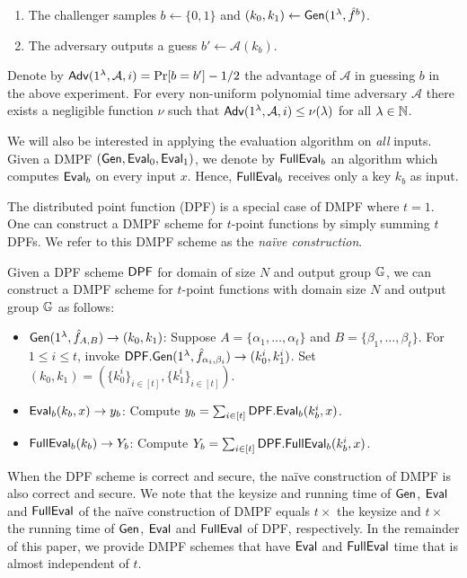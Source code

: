 \begin{definition}
\begin{itemize}
\begin{enumerate}
          \item The challenger samples $b\gets\{0,1\}$ and $(k_0,k_1)\leftarrow{\sf Gen}(1^\lambda,\hat{f}^b)$.
          \item The adversary outputs a guess $b'\leftarrow\mathcal{A}(k_b)$.
      \end{enumerate}
      Denote by ${\sf Adv}(1^\lambda,\mathcal{A},i)=\Pr[b=b']-1/2$ the advantage of $\mathcal{A}$ in guessing $b$ in the above experiment. For every non-uniform polynomial time adversary $\mathcal{A}$ there exists a negligible function $\nu$ such that ${\sf Adv}(1^\lambda,\mathcal{A},i) \le \nu(\lambda)$ for all $\lambda \in \mathbb{N}$.\fi
  \end{itemize}
  \end{definition}
 We will also be interested in applying the evaluation algorithm on \emph{all} inputs. Given a DMPF $({\sf Gen},{\sf Eval}_0,{\sf Eval}_1)$, we denote by ${\sf FullEval}_b$ an algorithm which computes ${\sf Eval}_b$ on every input $x$. Hence, ${\sf FullEval}_b$ receives only a key $k_b$ as input.

The distributed point function (DPF) is a special case of DMPF where $t=1$. 
One can construct a DMPF scheme for $t$-point functions by simply summing $t$ DPFs. We refer to this DMPF scheme as the {\em na\"ive construction}. 
\begin{construction}\label{con:naive_DMPF}
  Given a DPF scheme ${\sf DPF}$ for domain of size $N$ and output group $\mathbb{G}$, we can construct a DMPF scheme for $t$-point functions with domain size $N$ and output group $\mathbb{G}$ as follows: 
  \begin{itemize}
    \item ${\sf Gen}(1^\lambda, \hat{f}_{A, B})\rightarrow (k_0, k_1)$: Suppose $A = \{\alpha_1,\dots, \alpha_t\}$ and $B = \{\beta_1,\dots, \beta_t\}$. For $1\le i\le t$, invoke ${\sf DPF}.{\sf Gen}(1^\lambda, \hat{f}_{\alpha_i, \beta_i})\rightarrow (k_0^i, k_1^i)$. Set $(k_0, k_1) = (\{k_0^i\}_{i\in [t]}, \{k_1^i\}_{i\in [t]})$. 
    \item ${\sf Eval}_b(k_b, x)\rightarrow y_b$: Compute $y_b = \sum_{i\in [t]}{\sf DPF}.{\sf Eval}_b(k_b^i, x)$. 
    \item ${\sf FullEval}_b(k_b)\rightarrow Y_b$: Compute $Y_b = \sum_{i\in [t]}{\sf DPF}.{\sf FullEval}_b(k_b^i, x)$. 
  \end{itemize}
\end{construction}
When the DPF scheme is correct and secure, the na\"ive construction of DMPF is also correct and secure. We note that the keysize and running time of ${\sf Gen}$, ${\sf Eval}$ and ${\sf FullEval}$ of the na\"ive construction of DMPF equals $t\times $ the keysize and $t\times$ the running time of ${\sf Gen}$, ${\sf Eval}$ and ${\sf FullEval}$ of DPF, respectively. In the remainder of this paper, we provide DMPF schemes that have ${\sf Eval}$ and ${\sf FullEval}$ time that is almost independent of $t$. 
 
